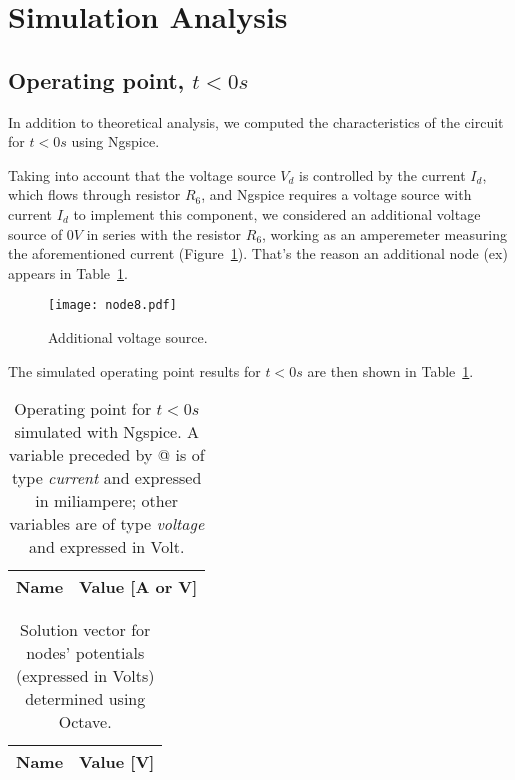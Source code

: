\section{Simulation Analysis}
\label{sec:simulation}

\subsection{Operating point, $t<0s$} \label{subsec:op}

In addition to theoretical analysis, we computed the characteristics of the circuit for $t<0s$ using Ngspice.

Taking into account that the voltage source $V_d$ is controlled by the current $I_d$, which flows through resistor $R_6$, and Ngspice requires a voltage source with current $I_d$ to implement this component, we considered an additional voltage source of $0V$ in series with the resistor $R_6$, working as an amperemeter measuring the aforementioned current (Figure~\ref{fig:node8}). That's the reason an additional node (ex) appears in Table~\ref{tab:op11}.

\begin{figure}[H] \centering
\texttt{[image: node8.pdf]}
\caption{Additional voltage source.}
\label{fig:node8}
\end{figure}

The simulated operating point results for $t<0s$ are then shown in Table~\ref{tab:op11}.

\vspace{1mm}

\begin{table}[H]
  \centering
  \begin{tabular}{|l|r|}
    \hline    
    {\bf Name} & {\bf Value [A or V]} \\ \hline
    
  \end{tabular}
  \caption{Operating point for $t<0s$ simulated with Ngspice. A variable preceded by @ is of type {\em current}
    and expressed in miliampere; other variables are of type {\it voltage} and expressed in
    Volt.}
  \label{tab:op11}
\end{table}


\begin{table}[H]
  \centering
  \begin{tabular}{|l|r|}
    \hline    
    {\bf Name} & {\bf Value [V]} \\ \hline
    
  \end{tabular}
  \caption{Solution vector for nodes' potentials (expressed in Volts) determined using Octave.}
  \label{tab:op12}
\end{table}


